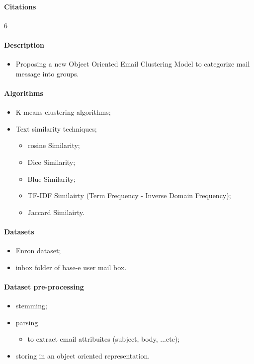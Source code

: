 \documentclass[12pt]{article}
\begin{document}
\paragraph{Citations}6
\paragraph{Description}
\begin{itemize}
    \item Proposing a new Object Oriented Email Clustering Model to categorize 
	  mail message into groups.
\end{itemize}

\paragraph{Algorithms}
\begin{itemize}
    \item K-means clustering algorithms;
    \item Text similarity techniques;
    \begin{itemize}
        \item cosine Similarity;
        \item Dice Similarity;
        \item Blue Similarity;
        \item TF-IDF Similairty (Term Frequency - Inverse Domain Frequency);
        \item Jaccard Similairty.
    \end{itemize}
\end{itemize}

\paragraph{Datasets}
\begin{itemize}
    \item Enron dataset;
    \item inbox folder of base-e user mail box.
\end{itemize}

\paragraph{Dataset pre-processing}
\begin{itemize}
    \item stemming;
    \item parsing
    \begin{itemize}
        \item to extract email attribuites (subject, body, ...etc);
    \end{itemize}
    \item storing in an object oriented representation.
\end{itemize}
\end{document}
